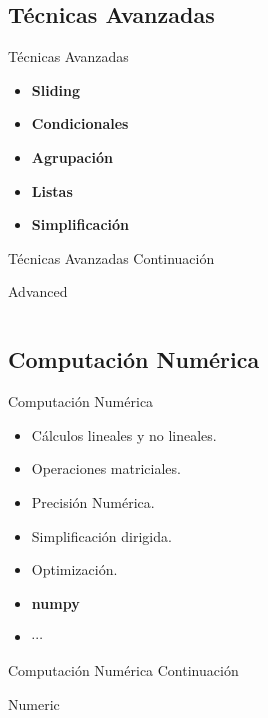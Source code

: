 \documentclass[usenames, dvipsnames, compress]{beamer}
\begin{document}
		\subsection{Técnicas Avanzadas}
		\begin{frame}{Técnicas Avanzadas}
		\begin{itemize}[<+- | alert@ +>]
			\item \textbf{Sliding}
			\item \textbf{Condicionales}
			\item \textbf{Agrupación}
			\item \textbf{Listas}
			\item \textbf{Simplificación}
		\end{itemize}
		\end{frame}
		\begin{frame}{Técnicas Avanzadas Continuación}
			\begin{block}{Advanced}
				\inputminted[xleftmargin=\parindent,linenos]{python}{codes/advanced_techniques.py}
			\end{block}
		\end{frame}
		\subsection{Computación Numérica}
		\begin{frame}{Computación Numérica}
			\begin{itemize}[<+- | alert@ +>]
				\item Cálculos lineales y no lineales.
				\item Operaciones matriciales.
				\item Precisión Numérica.
				\item Simplificación dirigida.
				\item Optimización.
				\item \textbf{numpy}
				\item $\cdots$
			\end{itemize}
		\end{frame}
		\begin{frame}{Computación Numérica Continuación}
			\begin{block}{Numeric}
				\inputminted[xleftmargin=\parindent,linenos]{python}{codes/numerical_computation.py}
			\end{block}
		\end{frame}
\end{document}
